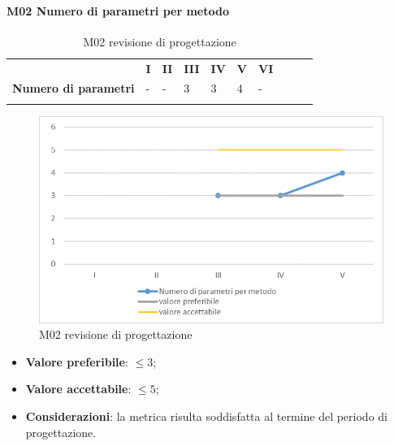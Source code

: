 \paragraph{M02 Numero di parametri per metodo} \mbox{}
\begin{longtable}[H!] {						
		>{}p{50mm}  		
		>{}p{8mm}
		>{}p{8mm}		
		>{}p{8mm}		
		>{}p{8mm}		
		>{}p{8mm}		
		>{}p{8mm}
		>{}p{8mm}
		>{}p{8mm}
		>{}p{8mm}
	}
	\rowcolor{gray!50}
	\textbf{} & \textbf{I} & \textbf{II} & \textbf{III} & \textbf{IV} & \textbf{V} & \textbf{VI} \TBstrut \\ [2mm]
	\textbf{Numero di parametri} & - & - & 3 & 3 & 4 & - \TBstrut \\ [2mm]
	\rowcolor{white}
	\caption{M02 revisione di progettazione}
\end{longtable}
\begin{figure}[H] 	
\includegraphics[width=\linewidth]{./img/grafici/RP2.png}	
\caption{M02 revisione di progettazione}	
\end{figure}
\begin{itemize}
	\item \textbf{Valore preferibile}: $\le3$;
	\item \textbf{Valore accettabile}: $\le5$;
	\item \textbf{Considerazioni}: la metrica risulta soddisfatta al termine del periodo di progettazione.
\end{itemize}
\pagebreak
